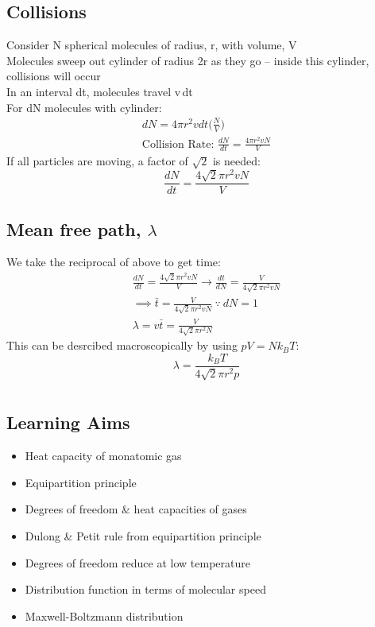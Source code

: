 \documentclass[a4paper, 11pt, fleqn, normalem]{report}
\begin{document}
\section{Collisions}
Consider N spherical molecules of radius, r, with volume, V \\
Molecules sweep out cylinder of radius 2r as they go -- inside this cylinder, collisions will occur \\
In an interval dt, molecules travel v{\,}dt \\
For dN molecules with cylinder:
\begin{gather*}
	dN = 4{\pi}r^{2}vdt\Big(\frac{N}{V}\Big) \\
	\text{Collision Rate: } \frac{dN}{dt} = \frac{4{\pi}r^{2}vN}{V}
\end{gather*}
If all particles are moving, a factor of $\sqrt{2}$ is needed:
\begin{equation*}
	\frac{dN}{dt} = \frac{4\sqrt{2}{\pi}r^{2}vN}{V}
\end{equation*}

\section{Mean free path, $\lambda$}
We take the reciprocal of above to get time:
\begin{gather*}
	\frac{dN}{dt} = \frac{4\sqrt{2}{\pi}r^{2}vN}{V} \rightarrow \frac{dt}{dN} = \frac{V}{4\sqrt{2}{\pi}r^{2}vN} \\
	\implies \bar{t} = \frac{V}{4\sqrt{2}{\pi}r^{2}vN} ~\because~ dN = 1 \\
	\lambda = v\bar{t} = \frac{V}{4\sqrt{2}{\pi}r^{2}N}
\end{gather*}
This can be desrcibed macroscopically by using $pV = Nk_{B}T$:
\begin{equation*}
	\lambda = \frac{k_{B}T}{4\sqrt{2}{\pi}r^{2}p}
\end{equation*}

\chapter{}
\thispagestyle{fancy}
\section{Learning Aims}
\begin{itemize}
	\item Heat capacity of monatomic gas
	\item Equipartition principle
	\item Degrees of freedom \& heat capacities of gases
	\item Dulong \& Petit rule from equipartition principle
	\item Degrees of freedom reduce at low temperature
	\item Distribution function in terms of molecular speed
	\item Maxwell-Boltzmann distribution
\end{itemize}
\end{document}
